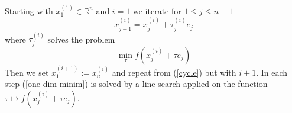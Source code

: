 \documentclass[17pt]{extarticle}
\begin{document}
Starting with $x_{1}^{(1)}\in \mathbb{R}^n$ and $i=1$
we iterate for $1\leq j\leq n-1$
\begin{equation} \label{cycle}
x_{j+1}^{(i)}=x_{j}^{(i)}+\tau_{j}^{(i)}e_j
\end{equation}
where $\tau_{j}^{(i)}$ solves the problem
\begin{equation} \label{one-dim-minim}
	\min_{\tau}f(x_{j}^{(i)}+\tau e_j)
\end{equation}
Then we set $x_{1}^{(i+1)}:=x_{n}^{(i)}$ and repeat from (\ref{cycle}) but with $i+1$. 
In each step (\ref{one-dim-minim}) is solved by a line search applied on the function $\tau\mapsto f(x_{j}^{(i)}+\tau e_j)$.
\end{document}
